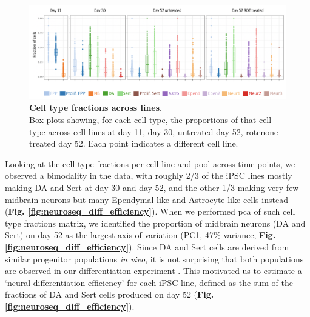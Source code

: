 \begin{figure}[h]
\includegraphics[width=15.5cm]{Chapter5/Fig/neuroseq_line_celltype.png}
\caption[Cell type fractions across lines]{\textbf{Cell type fractions across lines}.\\
Box plots showing, for each cell type, the proportions of that cell type across cell lines at day 11, day 30, untreated day 52, rotenone-treated day 52. 
Each point indicates a different cell line.}
\label{fig:neuroseq_line_variation}
\end{figure}


Looking at the cell type fractions per cell line and pool across time points, we observed a bimodality in the data, with roughly 2/3 of the iPSC lines mostly making DA and Sert at day 30 and day 52, and the other 1/3 making very few midbrain neurons but many Ependymal-like and Astrocyte-like cells instead (\textbf{Fig. \ref{fig:neuroseq_diff_efficiency}}).
When we performed \gls{pca} of such cell type fractions matrix, we identified the proportion of midbrain neurons (DA and Sert) on day 52 as the largest axis of variation (PC1, 47\% variance, \textbf{Fig. \ref{fig:neuroseq_diff_efficiency}}). 
Since DA and Sert cells are derived from similar progenitor populations \textit{in vivo}, it is not surprising that both populations are observed in our differentiation experiment \cite{ye1998fgf, cao2017characterization}. 
This motivated us to estimate a `neural differentiation efficiency' for each iPSC line, defined as the sum of the fractions of DA and Sert cells produced on day 52 (\textbf{Fig. \ref{fig:neuroseq_diff_efficiency}}). 
\\

